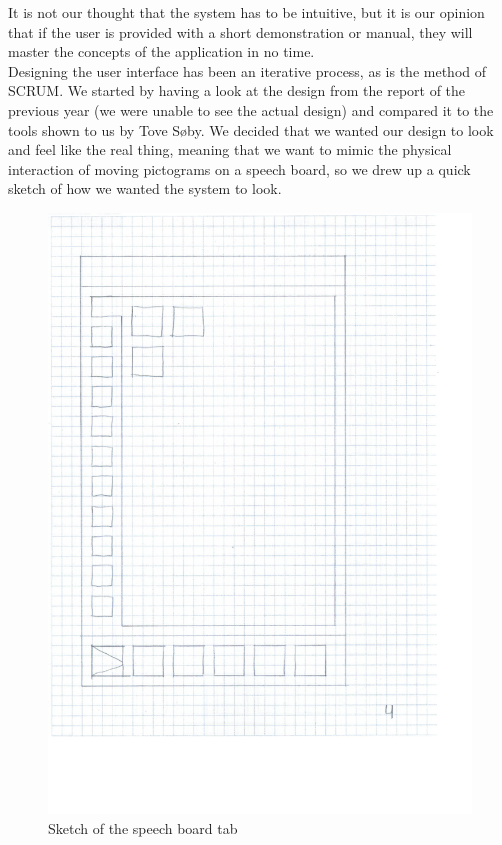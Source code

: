 It is not our thought that the system has to be intuitive, but it is our opinion that if the user is provided with a short demonstration or manual, they will master the concepts of the application in no time.\newline
\\
Designing the user interface has been an iterative process, as is the method of SCRUM. We started by having a look at the design from the report of the previous year (we were unable to see the actual design) and compared it to the tools shown to us by Tove S\o{}by.\newline%
We decided that we wanted our design to look and feel like the real thing, meaning that we want to mimic the physical interaction of moving pictograms on a speech board, so we drew up a quick sketch of how we wanted the system to look.\newline
\begin{figure}[htbp]
	\centering
		\includegraphics[scale=0.20]{input/images/speechboard_sketch.PNG}
		\caption{Sketch of the speech board tab}
	\label{fig:speechboard_sketch}
\end{figure}
